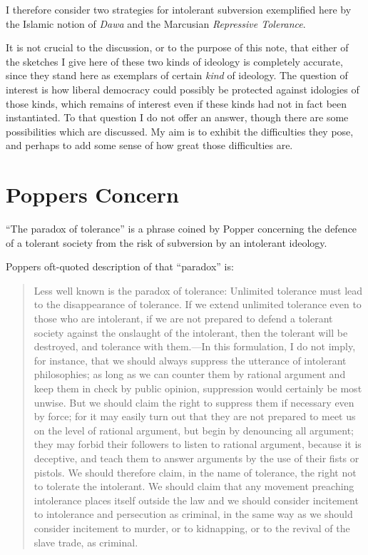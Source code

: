 \documentclass[10pt,titlepage]{article}
\begin{document}
I therefore consider two strategies for intolerant subversion exemplified here by the Islamic notion of \emph{Dawa}\cite{ali-dawa,sookhdeo-dawa} and the Marcusian \emph{Repressive Tolerance}\cite{marcuse-repressive}.

It is not crucial to the discussion, or to the purpose of this note, that either of the sketches I give here of these two kinds of ideology is completely accurate, since they stand here as exemplars of certain \emph{kind} of ideology.
The question of interest is how liberal democracy could possibly be protected against idologies of those kinds, which remains of interest even if these kinds had not in fact been instantiated.
To that question I do not offer an answer, though there are some possibilities which are discussed.
My aim is to exhibit the difficulties they pose, and perhaps to add some sense of how great those difficulties are.

\section{Poppers Concern}

``The paradox of tolerance'' is a phrase coined by Popper concerning the defence of a tolerant society from the risk of subversion by an intolerant ideology.

Poppers oft-quoted description of that ``paradox''  is:

\begin{quote}

Less well known is the paradox of tolerance: Unlimited tolerance must lead to the disappearance of tolerance. If we extend unlimited tolerance even to those who are intolerant, if we are not prepared to defend a tolerant society against the onslaught of the intolerant, then the tolerant will be destroyed, and tolerance with them.—In this formulation, I do not imply, for instance, that we should always suppress the utterance of intolerant philosophies; as long as we can counter them by rational argument and keep them in check by public opinion, suppression would certainly be most unwise. But we should claim the right to suppress them if necessary even by force; for it may easily turn out that they are not prepared to meet us on the level of rational argument, but begin by denouncing all argument; they may forbid their followers to listen to rational argument, because it is deceptive, and teach them to answer arguments by the use of their fists or pistols. We should therefore claim, in the name of tolerance, the right not to tolerate the intolerant. We should claim that any movement preaching intolerance places itself outside the law and we should consider incitement to intolerance and persecution as criminal, in the same way as we should consider incitement to murder, or to kidnapping, or to the revival of the slave trade, as criminal.

\end{quote}
\end{document}
